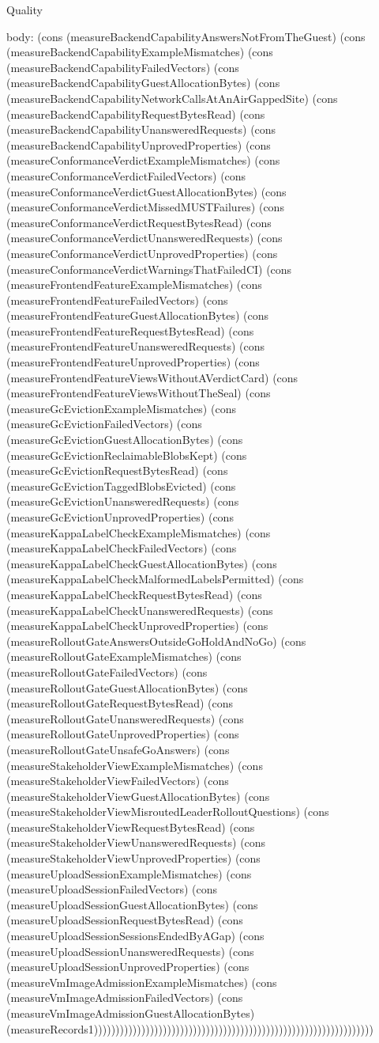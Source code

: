\begin{lexlean}{Quality}
\begin{semanticmodule}
{  body: (cons (measureBackendCapabilityAnswersNotFromTheGuest) (cons (measureBackendCapabilityExampleMismatches) (cons (measureBackendCapabilityFailedVectors) (cons (measureBackendCapabilityGuestAllocationBytes) (cons (measureBackendCapabilityNetworkCallsAtAnAirGappedSite) (cons (measureBackendCapabilityRequestBytesRead) (cons (measureBackendCapabilityUnansweredRequests) (cons (measureBackendCapabilityUnprovedProperties) (cons (measureConformanceVerdictExampleMismatches) (cons (measureConformanceVerdictFailedVectors) (cons (measureConformanceVerdictGuestAllocationBytes) (cons (measureConformanceVerdictMissedMUSTFailures) (cons (measureConformanceVerdictRequestBytesRead) (cons (measureConformanceVerdictUnansweredRequests) (cons (measureConformanceVerdictUnprovedProperties) (cons (measureConformanceVerdictWarningsThatFailedCI) (cons (measureFrontendFeatureExampleMismatches) (cons (measureFrontendFeatureFailedVectors) (cons (measureFrontendFeatureGuestAllocationBytes) (cons (measureFrontendFeatureRequestBytesRead) (cons (measureFrontendFeatureUnansweredRequests) (cons (measureFrontendFeatureUnprovedProperties) (cons (measureFrontendFeatureViewsWithoutAVerdictCard) (cons (measureFrontendFeatureViewsWithoutTheSeal) (cons (measureGcEvictionExampleMismatches) (cons (measureGcEvictionFailedVectors) (cons (measureGcEvictionGuestAllocationBytes) (cons (measureGcEvictionReclaimableBlobsKept) (cons (measureGcEvictionRequestBytesRead) (cons (measureGcEvictionTaggedBlobsEvicted) (cons (measureGcEvictionUnansweredRequests) (cons (measureGcEvictionUnprovedProperties) (cons (measureKappaLabelCheckExampleMismatches) (cons (measureKappaLabelCheckFailedVectors) (cons (measureKappaLabelCheckGuestAllocationBytes) (cons (measureKappaLabelCheckMalformedLabelsPermitted) (cons (measureKappaLabelCheckRequestBytesRead) (cons (measureKappaLabelCheckUnansweredRequests) (cons (measureKappaLabelCheckUnprovedProperties) (cons (measureRolloutGateAnswersOutsideGoHoldAndNoGo) (cons (measureRolloutGateExampleMismatches) (cons (measureRolloutGateFailedVectors) (cons (measureRolloutGateGuestAllocationBytes) (cons (measureRolloutGateRequestBytesRead) (cons (measureRolloutGateUnansweredRequests) (cons (measureRolloutGateUnprovedProperties) (cons (measureRolloutGateUnsafeGoAnswers) (cons (measureStakeholderViewExampleMismatches) (cons (measureStakeholderViewFailedVectors) (cons (measureStakeholderViewGuestAllocationBytes) (cons (measureStakeholderViewMisroutedLeaderRolloutQuestions) (cons (measureStakeholderViewRequestBytesRead) (cons (measureStakeholderViewUnansweredRequests) (cons (measureStakeholderViewUnprovedProperties) (cons (measureUploadSessionExampleMismatches) (cons (measureUploadSessionFailedVectors) (cons (measureUploadSessionGuestAllocationBytes) (cons (measureUploadSessionRequestBytesRead) (cons (measureUploadSessionSessionsEndedByAGap) (cons (measureUploadSessionUnansweredRequests) (cons (measureUploadSessionUnprovedProperties) (cons (measureVmImageAdmissionExampleMismatches) (cons (measureVmImageAdmissionFailedVectors) (cons (measureVmImageAdmissionGuestAllocationBytes) (measureRecords1)))))))))))))))))))))))))))))))))))))))))))))))))))))))))))))))))
}


\end{semanticmodule}
\end{lexlean}
